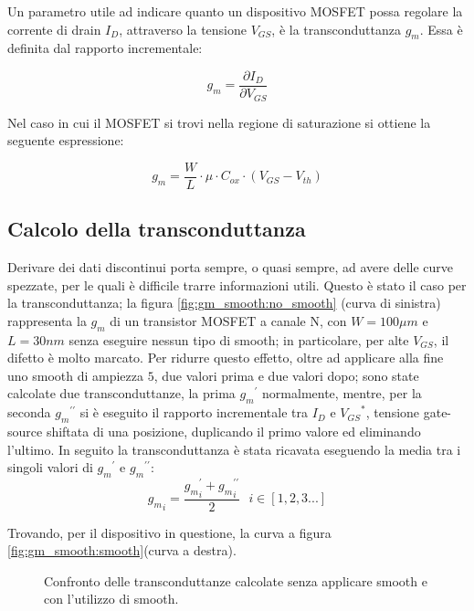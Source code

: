 Un parametro utile ad indicare quanto un dispositivo MOSFET possa regolare la corrente di drain $I_D$, attraverso la tensione $V_{GS}$, è la transconduttanza $g_m$. Essa è definita dal rapporto incrementale:

$$g_m = \frac{\partial I_D}{\partial V_{GS}}$$

Nel caso in cui il MOSFET si trovi nella regione di saturazione si ottiene la seguente espressione:

$$g_m = \frac{W}{L} \cdot \mu \cdot C_{ox} \cdot (V_{GS} - V_{th})$$


\subsection{Calcolo della transconduttanza}
Derivare dei dati discontinui porta sempre, o quasi sempre, ad avere delle curve spezzate, per le quali è difficile trarre informazioni utili.
Questo è stato il caso per la transconduttanza; la figura \ref{fig:gm_smooth:no_smooth} (curva di sinistra) rappresenta la $g_m$ di un transistor  MOSFET a canale N, con $ W = 100\mu m$ e $L = 30 nm$ senza eseguire nessun tipo di smooth; in particolare, per alte $V_{GS}$, il difetto è molto marcato. Per ridurre questo effetto, oltre ad applicare alla fine uno smooth di ampiezza $5$, due valori prima e due valori dopo; sono state calcolate due transconduttanze, la prima ${g_m}^{\prime}$ normalmente, mentre, per la seconda ${g_m}^{\prime \prime}$ si è eseguito il rapporto incrementale tra $I_D$ e ${V_{GS}}^*$, tensione gate-source shiftata di una posizione, duplicando il primo valore ed eliminando l'ultimo. In seguito la transconduttanza è stata ricavata eseguendo la media tra i singoli valori di ${g_m}^\prime \text{ e } {g_m}^{\prime \prime}$:
$${g_m}_i = \frac{{g_m}_i^{\prime} + {g_m}_i^{\prime \prime}}{2} \text{ } i \in [1 , 2 , 3 . . .]$$

Trovando, per il dispositivo in questione, la curva a figura \ref{fig:gm_smooth:smooth}(curva a destra).

\begin{figure}[ht]
    \centering

    \caption[Confronto $g_m$ senza utilizzo di smooth e con utilizzo di smooth]{Confronto delle transconduttanze calcolate senza applicare smooth e con l'utilizzo di smooth.}
    \label{fig:gm_smooth}
\end{figure}



